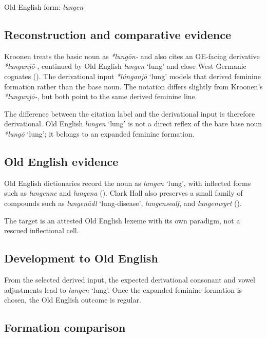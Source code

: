 \documentclass[
  british,
  a4paper,
  openany]{book}
\providecommand{\Recon}[1]{\emph{*#1}}
{\catcode`→=\active \global\def→{\ensuremath{\rightarrow}}}
\providecommand{\Recon}[1]{\emph{*#1}}
{\catcode`→=\active \global\def→{\ensuremath{\rightarrow}}}
\begin{document}
Old English form: \emph{lungen}

\subsection{Reconstruction and comparative
evidence}\label{reconstruction-and-comparative-evidence-88}

Kroonen treats the basic noun as \emph{*lungōn-} and also cites an
OE-facing derivative \emph{*lungunjō-}, continued by Old English
{\emph{lungen}} `lung' and close West Germanic cognates
(). The derivational input
\Recon{lúnganjō} `lung' models that derived feminine formation rather
than the base noun. The notation differs slightly from Kroonen's
\emph{*lungunjō-}, but both point to the same derived feminine line.

The difference between the citation label and the derivational input is
therefore derivational. Old English {\emph{lungen}} `lung' is not a
direct reflex of the bare base noun \Recon{lungō} `lung'; it belongs to
an expanded feminine formation.

\subsection{Old English evidence}\label{old-english-evidence-88}

Old English dictionaries record the noun as {\emph{lungen}} `lung', with
inflected forms such as \emph{lungenne} and \emph{lungena}
().
Clark Hall also preserves a small family of compounds such as
\emph{lungenādl} `lung-disease', \emph{lungensealf}, and
\emph{lungenwyrt} ().

The target is an attested Old English lexeme with its own paradigm, not
a rescued inflectional cell.

\subsection{Development to Old
English}\label{development-to-old-english-88}

From the selected derived input, the expected derivational consonant and
vowel adjustments lead to {\emph{lungen}} `lung'. Once the expanded
feminine formation is chosen, the Old English outcome is regular.

\subsection{Formation comparison}\label{formation-comparison-3}
\end{document}
